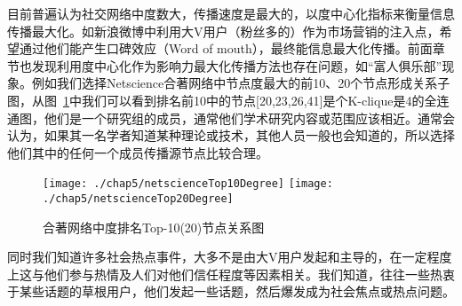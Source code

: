 目前普遍认为社交网络中度数大，传播速度是最大的，以度中心化指标来衡量信息传播最大化。如新浪微博中利用大V用户（粉丝多的）作为市场营销的注入点，希望通过他们能产生口碑效应（Word of mouth），\cite{trusov2009effects,chevalier2006effect}最终能信息最大化传播。前面章节也发现利用度中心化作为影响力最大化传播方法也存在问题，如“富人俱乐部”现象。例如我们选择Netscience合著网络\cite{boccaletti2006complex}中节点度最大的前10、20个节点形成关系子图，从图~\ref{fig:chap05netscienceTopKDegree}中我们可以看到排名前10中的节点[20,23,26,41]是个K-clique\cite{palla2005uncovering}是4的全连通图，他们是一个研究组的成员，通常他们学术研究内容或范围应该相近。通常会认为，如果其一名学者知道某种理论或技术，其他人员一般也会知道的，所以选择他们其中的任何一个成员传播源节点比较合理。
\begin{figure}[H]
	\centering%
	{\texttt{[image: ./chap5/netscienceTop10Degree]}}
	{\texttt{[image: ./chap5/netscienceTop20Degree]}}
	\caption{合著网络中度排名Top-10(20)节点关系图}
	\label{fig:chap05netscienceTopKDegree}
\end{figure}
同时我们知道许多社会热点事件，大多不是由大V用户发起和主导的，在一定程度上这与他们参与热情及人们对他们信任程度等因素相关。我们知道，往往一些热衷于某些话题的草根用户，他们发起一些话题，然后爆发成为社会焦点或热点问题。

%
%	

